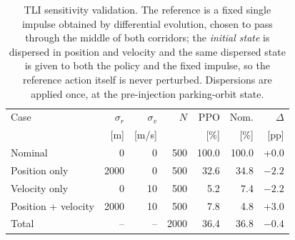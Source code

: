 \begin{table}[hbt!]
\centering
\small
\caption{TLI sensitivity validation. The reference is a fixed single impulse obtained by differential evolution, chosen to pass through the middle of both corridors; the \emph{initial state} is dispersed in position and velocity and the same dispersed state is given to both the policy and the fixed impulse, so the reference action itself is never perturbed. Dispersions are applied once, at the pre-injection parking-orbit state.}
\label{tab:tli_sensitivity}
\begin{tabular}{lrrrrrr}
\toprule
Case & $\sigma_r$ & $\sigma_v$ & $N$ & PPO & Nom. & $\Delta$ \\
 & [m] & [m/s] & & [\%] & [\%] & [pp] \\
\midrule
Nominal & 0 & 0 & 500 & 100.0 & 100.0 & +0.0 \\
Position only & 2000 & 0 & 500 & 32.6 & 34.8 & $-2.2$ \\
Velocity only & 0 & 10 & 500 & 5.2 & 7.4 & $-2.2$ \\
Position + velocity & 2000 & 10 & 500 & 7.8 & 4.8 & +3.0 \\
\midrule
Total & -- & -- & 2000 & 36.4 & 36.8 & $-0.4$ \\
\bottomrule
\end{tabular}
\end{table}